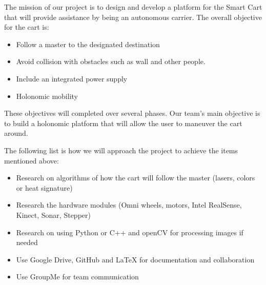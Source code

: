 The mission of our project is to design and develop a platform for the Smart Cart that will provide assistance by being an autonomous carrier. The overall objective for the cart is:
\begin{itemize}
	\item Follow a master to the designated destination
	\item Avoid collision with obstacles such as wall and other people.
	\item Include an integrated power supply
	\item Holonomic mobility
\end{itemize}
These objectives will completed over several phases. Our team’s main objective is to build a holonomic platform that will allow the user to maneuver the cart around. 

The following list is how we will approach the project to achieve the items mentioned above:
\begin{itemize}
	\item Research on algorithms of how the cart will follow the master (lasers, colors or heat signature)
	\item Research the hardware modules (Omni wheels, motors, Intel RealSense, Kinect, Sonar, Stepper)
	\item Research on using Python or C++ and openCV for processing images if needed
	\item Use Google Drive, GitHub and LaTeX for documentation and collaboration
	\item Use GroupMe for team communication
\end{itemize}
